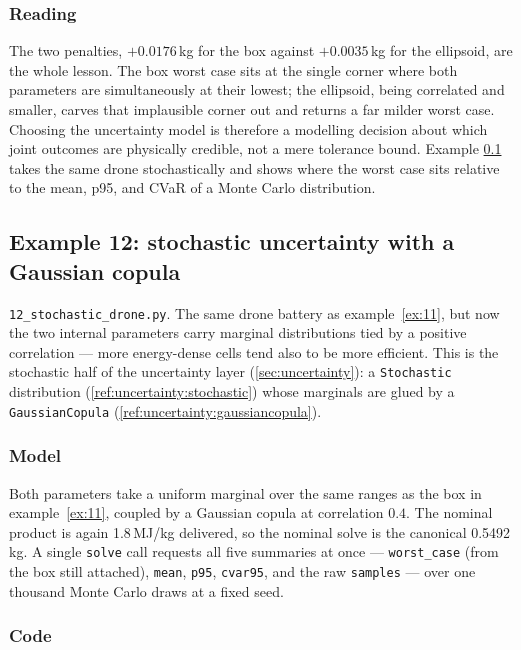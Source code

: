 \documentclass[11pt,a4paper]{article}
\begin{document}
\subsubsection*{Reading}

The two penalties, $+0.0176$\,kg for the box against $+0.0035$\,kg for
the ellipsoid, are the whole lesson. The box worst case sits at the
single corner where both parameters are simultaneously at their lowest;
the ellipsoid, being correlated and smaller, carves that implausible
corner out and returns a far milder worst case. Choosing the
uncertainty model is therefore a modelling decision about which joint
outcomes are physically credible, not a mere tolerance bound. Example
\ref{ex:12} takes the same drone stochastically and shows where the
worst case sits relative to the mean, p95, and CVaR of a Monte Carlo
distribution.

\subsection{Example 12: stochastic uncertainty with a Gaussian copula}
\label{ex:12}

\texttt{12\_stochastic\_drone.py}. The same drone battery as
example~\ref{ex:11}, but now the two internal parameters carry marginal
distributions tied by a positive correlation --- more energy-dense
cells tend also to be more efficient. This is the stochastic half of
the uncertainty layer (\ref{sec:uncertainty}): a \texttt{Stochastic}
distribution (\ref{ref:uncertainty:stochastic}) whose marginals are
glued by a \texttt{GaussianCopula}
(\ref{ref:uncertainty:gaussiancopula}).

\subsubsection*{Model}

Both parameters take a uniform marginal over the same ranges as the
box in example~\ref{ex:11}, coupled by a Gaussian copula at correlation
$0.4$. The nominal product is again 1.8\,MJ/kg delivered, so the
nominal solve is the canonical 0.5492\,kg. A single \texttt{solve} call
requests all five summaries at once --- \texttt{worst\_case} (from the
box still attached), \texttt{mean}, \texttt{p95}, \texttt{cvar95}, and
the raw \texttt{samples} --- over one thousand Monte Carlo draws at a
fixed seed.

\subsubsection*{Code}
\end{document}
